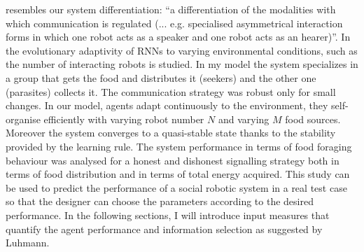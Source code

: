 resembles our system differentiation: ``a differentiation of the modalities with
which communication is regulated (... e.g. specialised asymmetrical interaction
forms in which one robot acts as a speaker and one robot acts as an hearer)''.
In \citep{EmergenceCommMas} the evolutionary adaptivity of RNNs to
varying environmental conditions, such as the number of interacting robots is studied.
In my model the system specializes in a group that gets the food and distributes it (seekers) and
the other one (parasites) collects it.
The communication strategy was robust only for small changes. In our model,
agents adapt continuously to the environment, they self-organise efficiently
with varying robot number $N$ and varying $M$ food sources.
Moreover the system converges to a quasi-stable state thanks to the stability
provided by the learning rule.
The system performance in terms of food foraging behaviour was analysed for 
a honest and dishonest signalling strategy both in terms of food distribution
and in terms of total energy acquired.
This study can be used to predict the performance of a social robotic system in
a real test case so that the designer can choose the parameters according to the
desired performance.
In the following sections, I will introduce input measures that quantify the
agent performance and information selection as suggested by Luhmann. 





